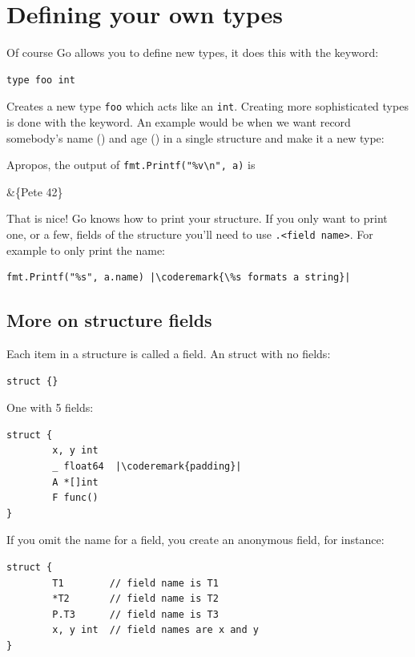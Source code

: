 \section{Defining your own types}
\label{sec:defining your own}
Of course Go allows you to define new types, it does this 
with the  keyword: 
\begin{lstlisting}
type foo int
\end{lstlisting}
Creates
a new type \lstinline{foo} which acts like an \lstinline{int}.
Creating more sophisticated types is done with the
keyword.
An example would be when we want record somebody's name ()
and age () in a single structure and make it a new type:

Apropos, the output of \lstinline{fmt.Printf("%v\n", a)} is 
\begin{display}
&\{Pete 42\}
\end{display}
That is nice!
Go knows how to print your structure. If you
only want to print one, or a few, fields of the structure you'll
need to use \verb|.<field name>|. For example to only print the name:
\begin{lstlisting}
fmt.Printf("%s", a.name) |\coderemark{\%s formats a string}|
\end{lstlisting}

\subsection{More on structure fields}
Each item in a structure is called a field. 
An struct with no fields:
\begin{lstlisting}
struct {}
\end{lstlisting}

One with 5 fields:
\begin{lstlisting}
struct {
        x, y int
        _ float64  |\coderemark{padding}|
        A *[]int
        F func()
}
\end{lstlisting}
If you omit the name for a field, you create an anonymous field, for
instance:
\begin{lstlisting}
struct {
        T1        // field name is T1
        *T2       // field name is T2
        P.T3      // field name is T3
        x, y int  // field names are x and y
}
\end{lstlisting}

